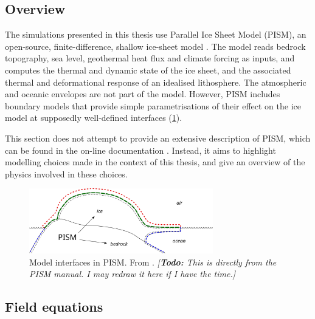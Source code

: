 \documentclass{article}
\newcommand{\todo}[1]{\emph{[\textbf{Todo:} #1]}}
\begin{document}
\subsection{Overview}

The simulations presented in this thesis use Parallel Ice Sheet Model (PISM),
an open-source, finite-difference, shallow ice-sheet model
\citep{PISM-authors.2014}. The model reads bedrock topography, sea level,
geothermal heat flux and climate forcing as inputs, and computes the thermal
and dynamic state of the ice sheet, and the associated thermal and
deformational response of an idealised lithosphere. The atmospheric and oceanic
envelopes are not part of the model. However, PISM includes boundary models
that provide simple parametrisations of their effect on the ice model at
supposedly well-defined interfaces (\cref{fig:model-interfaces}).

This section does not attempt to provide an extensive description of PISM,
which can be found in the on-line documentation \citep{PISM-authors.2014}.
Instead, it aims to highlight modelling choices made in the context of this
thesis, and give an overview of the physics involved in these choices.

\begin{figure}
  \centering
  \includegraphics[width=80mm]{model-interfaces}
  \caption{Model interfaces in PISM. From \citet{PISM-authors.2014}.
           \todo{This is directly from the PISM manual. I may redraw it here
                 if I have the time.}}
  \label{fig:model-interfaces}
\end{figure}

\subsection{Field equations}
\end{document}
